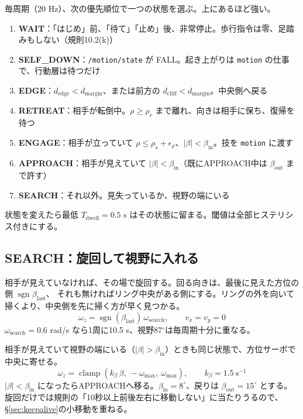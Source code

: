 \documentclass[a4paper,11pt]{ltjsarticle}
\newcommand{\code}[1]{\texttt{#1}}
\DeclareMathOperator{\clamp}{clamp}
\DeclareMathOperator{\sgn}{sgn}
\begin{document}
毎周期（20 Hz）、次の優先順位で一つの状態を選ぶ。上にあるほど強い。
\begin{enumerate}
\item \textbf{WAIT}：「はじめ」前、「待て」「止め」後、非常停止。歩行指令は零、足踏みもしない（規則10.2(k)）
\item \textbf{SELF\_DOWN}：\code{/motion/state} が FALL。起き上がりは \code{motion} の仕事で、行動層は待つだけ
\item \textbf{EDGE}：$d_\mathrm{edge}<d_\mathrm{margin}$、または前方の $d_\mathrm{cliff}<d_\mathrm{margin}$。中央側へ戻る
\item \textbf{RETREAT}：相手が転倒中。$\rho\ge\rho_r$ まで離れ、向きは相手に保ち、復帰を待つ
\item \textbf{ENGAGE}：相手が立っていて $\rho\le\rho_s+\epsilon_\rho$、$|\beta|<\beta_\mathrm{in}$。技を \code{motion} に渡す
\item \textbf{APPROACH}：相手が見えていて $|\beta|<\beta_\mathrm{in}$（既にAPPROACH中は $\beta_\mathrm{out}$ まで許す）
\item \textbf{SEARCH}：それ以外。見失っているか、視野の端にいる
\end{enumerate}
状態を変えたら最低 $T_\mathrm{dwell}=0.5$ s はその状態に留まる。閾値は全部ヒステリシス付きにする。

\subsection{SEARCH：旋回して視野に入れる}

相手が見えていなければ、その場で旋回する。回る向きは、最後に見えた方位の側 $\sgn\beta_\mathrm{last}$、
それも無ければリング中央がある側にする。リングの外を向いて掃くより、中央側を先に掃く方が早く見つかる。
\begin{equation}
\omega_z=\sgn(\beta_\mathrm{last})\,\omega_\mathrm{search},\qquad v_x=v_y=0
\end{equation}
$\omega_\mathrm{search}=0.6$ rad/s なら1周に10.5 s、視野87$^\circ$は毎周期十分に重なる。

相手が見えていて視野の端にいる（$|\beta|>\beta_\mathrm{in}$）ときも同じ状態で、方位サーボで中央に寄せる。
\begin{equation}
\omega_z=\clamp\!\left(k_\beta\,\beta,\ -\omega_{\max},\ \omega_{\max}\right),\qquad k_\beta=1.5\ \mathrm{s^{-1}}
\label{eq:bearing}
\end{equation}
$|\beta|<\beta_\mathrm{in}$ になったらAPPROACHへ移る。$\beta_\mathrm{in}=8^\circ$、戻りは $\beta_\mathrm{out}=15^\circ$ とする。
旋回だけでは規則の「10秒以上前後左右に移動しない」に当たりうるので、\S\ref{sec:keepalive}の小移動を重ねる。
\end{document}
